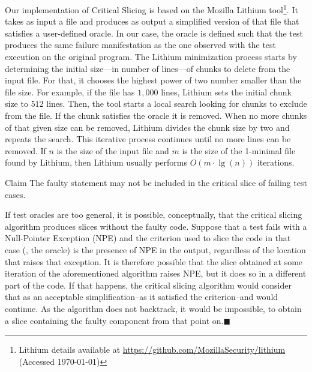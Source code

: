 \documentclass{article}
\begin{document}
Our implementation of Critical Slicing is based on the Mozilla Lithium
tool\footnote{Lithium details available at {\footnotesize\url{https://github.com/MozillaSecurity/lithium}} (Accessed \today)}. It takes as input a file
and produces as output a simplified version of that file that
satisfies a user-defined oracle. In our case, the oracle is defined
such that the test produces the same failure manifestation as the one
observed with the test execution on the original program. The
Lithium minimization process starts by determining the initial size---in
number of lines---of chunks to delete from the input file. For that,
it chooses the highest power of two number smaller than the file
size. For example, if the file has $1,000$ lines, Lithium sets the
initial chunk size to $512$ lines. Then, the tool starts a local search looking
for chunks to exclude from the file. If the chunk satisfies the oracle it is removed.
When no more chunks of that given size can be removed, Lithium
divides the chunk size by two and repeats the search. This iterative
process continues until no more lines can be removed.  If $n$ is the
size of the input file and $m$ is the size of the 1-minimal file found
by Lithium, then Lithium usually performs $O(m\cdot\lg(n))$
iterations. %

\begin{namedthm}{Claim}\label{claim:1}
  The faulty statement may not be included in the critical slice of
  failing test cases.
\end{namedthm}

If test oracles are too general, it is possible, conceptually, that
the critical slicing algorithm produces slices without the faulty
code. Suppose that a test fails with a Null-Pointer Exception (NPE)
and the criterion used to slice the code in that case (\ie{}, the
oracle) is the presence of NPE in the output, regardless of the
location that raises that exception. It is therefore possible that the
slice obtained at some iteration of the aforementioned algorithm
raises NPE, but it does so in a different part of the code. If that
happens, the critical slicing algorithm would consider that as an
acceptable simplification--as it satisfied the criterion--and would
continue. As the algorithm does not backtrack, it would be impossible,
to obtain a slice containing the faulty component from that point
on.\hfill{\tiny$\blacksquare$}
\end{document}
